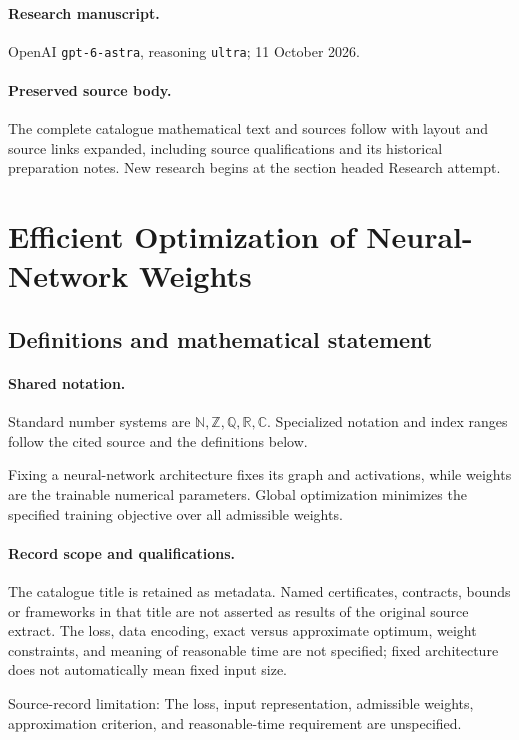 \documentclass[11pt]{article}
\begin{document}
\paragraph{Research manuscript.} OpenAI \texttt{gpt-6-astra}, reasoning \texttt{ultra}; 11 October 2026.
\paragraph{Preserved source body.} The complete catalogue mathematical text and sources follow with layout and source links expanded, including source qualifications and its historical preparation notes. New research begins at the section headed Research attempt.

\section{Efficient Optimization of Neural-Network Weights}\label{statement}

\subsection{Definitions and mathematical statement}

\paragraph{Shared notation.}Standard number systems are $\mathbb N,\mathbb Z,\mathbb Q,\mathbb R,\mathbb C$. Specialized notation and index ranges follow the cited source and the definitions below.


Fixing a neural-network architecture fixes its graph and activations, while weights are the trainable numerical parameters. Global optimization minimizes the specified training objective over all admissible weights.
\paragraph{Record scope and qualifications.}
The catalogue title is retained as metadata. Named certificates, contracts, bounds or frameworks in that title are not asserted as results of the original source extract.
The loss, data encoding, exact versus approximate optimum, weight constraints, and meaning of reasonable time are not specified; fixed architecture does not automatically mean fixed input size.

Source-record limitation: The loss, input representation, admissible weights, approximation criterion, and reasonable-time requirement are unspecified.
\end{document}
